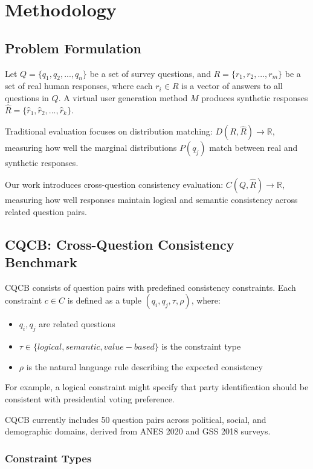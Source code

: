 \documentclass[sigconf, anonymous]{acmart}
\begin{document}
\section{Methodology}

\subsection{Problem Formulation}

Let $Q = \{q_1, q_2, ..., q_n\}$ be a set of survey questions, and $R = \{r_1, r_2, ..., r_m\}$ be a set of real human responses, where each $r_i \in R$ is a vector of answers to all questions in $Q$. A virtual user generation method $M$ produces synthetic responses $\hat{R} = \{\hat{r}_1, \hat{r}_2, ..., \hat{r}_k\}$.

Traditional evaluation focuses on distribution matching: $D(R, \hat{R}) \rightarrow \mathbb{R}$, measuring how well the marginal distributions $P(q_j)$ match between real and synthetic responses.

Our work introduces cross-question consistency evaluation: $C(Q, \hat{R}) \rightarrow \mathbb{R}$, measuring how well responses maintain logical and semantic consistency across related question pairs.

\subsection{CQCB: Cross-Question Consistency Benchmark}

CQCB consists of question pairs with predefined consistency constraints. Each constraint $c \in C$ is defined as a tuple $(q_i, q_j, \tau, \rho)$, where:

\begin{itemize}
    \item $q_i, q_j$ are related questions
    \item $\tau \in \{logical, semantic, value-based\}$ is the constraint type
    \item $\rho$ is the natural language rule describing the expected consistency
\end{itemize}

For example, a logical constraint might specify that party identification should be consistent with presidential voting preference.

CQCB currently includes 50 question pairs across political, social, and demographic domains, derived from ANES 2020 and GSS 2018 surveys.

\subsubsection{Constraint Types}
\end{document}
